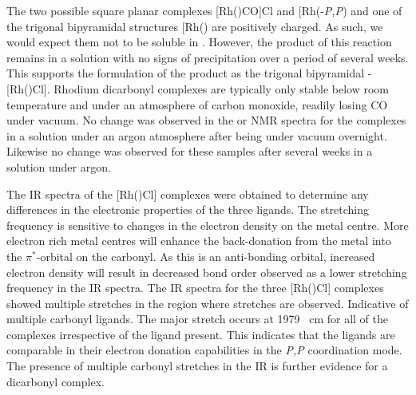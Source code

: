 The two possible square planar complexes [Rh(\tBuxantphosk)CO]Cl and [Rh(\tBuxantphos-\dento{}\emph{P,P}\textprime)\ce{(CO)2]Cl} and one of the trigonal bipyramidal structures [Rh(\tBuxantphosk)\ce{(CO)2]Cl} are positively charged.  As such, we would expect them not to be soluble in .  However, the product of this reaction remains in a  solution with no signs of precipitation over a period of several weeks.  This supports the formulation of the product as the trigonal bipyramidal \trans-[Rh(\tBuxantphos)Cl].  Rhodium dicarbonyl complexes are typically only stable below room temperature and under an atmosphere of carbon monoxide, readily losing CO under vacuum.\cite{Sanger1984, Sanger1985}  No change was observed in the \phosphorus{} or \proton{} NMR spectra for the complexes in a  solution under an argon atmosphere after being under vacuum overnight.  Likewise no change was observed for these samples after several weeks in a  solution under argon.  

The \gls{IR} spectra of the [Rh(\tBuxantphos)Cl] complexes were obtained to determine any differences in the electronic properties of the three ligands.  The  stretching frequency is sensitive to changes in the electron density on the metal centre.  More electron rich metal centres will enhance the back-donation from the metal into the $\pi^*$-orbital on the carbonyl.  As this is an anti-bonding orbital, increased electron density will result in decreased bond order observed as a lower  stretching frequency in the \gls{IR} spectra.  The \gls{IR} spectra for the three [Rh(\tBuxantphos)Cl] complexes showed multiple stretches in the region where  stretches are observed.  Indicative of multiple carbonyl ligands.  The major  stretch occurs at 1979 \si{\per\centi\metre} for all of the complexes irrespective of the \tBuxantphos{} ligand present.  This indicates that the ligands are comparable in their electron donation capabilities in the \dento{}\emph{P,P}\textprime{} coordination mode.  The presence of multiple carbonyl stretches in the \gls{IR} is further evidence for a dicarbonyl complex.  

